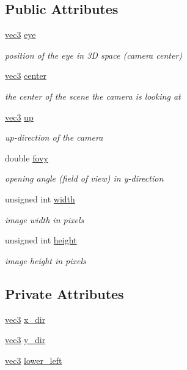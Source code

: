 \subsection*{Public Attributes}
\begin{DoxyCompactItemize}
\item 
\hyperlink{classvec3}{vec3} \hyperlink{classCamera_a54104afe20129304cdd64d1d2a9ee5f6}{eye}
\begin{DoxyCompactList}\small\item\em position of the eye in 3D space (camera center) \end{DoxyCompactList}\item 
\hyperlink{classvec3}{vec3} \hyperlink{classCamera_a448dbf45a96fde76b524d0b183f876dc}{center}
\begin{DoxyCompactList}\small\item\em the center of the scene the camera is looking at \end{DoxyCompactList}\item 
\hyperlink{classvec3}{vec3} \hyperlink{classCamera_aff4fd1aa62994840f7742b698f15313e}{up}
\begin{DoxyCompactList}\small\item\em up-\/direction of the camera \end{DoxyCompactList}\item 
double \hyperlink{classCamera_a15e5d72f51341a192a09d70447e3fb53}{fovy}
\begin{DoxyCompactList}\small\item\em opening angle (field of view) in y-\/direction \end{DoxyCompactList}\item 
unsigned int \hyperlink{classCamera_aa18f0bf8b6e8cb661643d980a4484ac0}{width}
\begin{DoxyCompactList}\small\item\em image width in pixels \end{DoxyCompactList}\item 
unsigned int \hyperlink{classCamera_ae9ed166dbbc8876027ecbec9af8761c4}{height}
\begin{DoxyCompactList}\small\item\em image height in pixels \end{DoxyCompactList}\end{DoxyCompactItemize}
\subsection*{Private Attributes}
\begin{DoxyCompactItemize}
\item 
\hyperlink{classvec3}{vec3} \hyperlink{classCamera_aa7766618e7cc508ff0a825559e014d31}{x\+\_\+dir}
\item 
\hyperlink{classvec3}{vec3} \hyperlink{classCamera_a55166ac03aba3b694e9ef2df29be58f0}{y\+\_\+dir}
\item 
\hyperlink{classvec3}{vec3} \hyperlink{classCamera_a7bf1e46dd54906691adf532cc39b664f}{lower\+\_\+left}
\end{DoxyCompactItemize}


